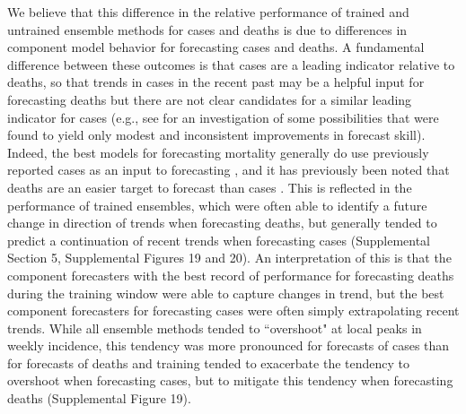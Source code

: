\documentclass[11pt,3p,review,authoryear]{elsarticle}
\begin{document}
We believe that this difference in the relative performance of trained and untrained ensemble methods for cases and deaths is due to differences in component model behavior for forecasting cases and deaths.
A fundamental difference between these outcomes is that cases are a leading indicator relative to deaths, so that trends in cases in the recent past may be a helpful input for forecasting deaths \textemdash but there are not clear candidates for a similar leading indicator for cases (e.g., see \cite{mcdonald_auxiliary_indicators_covid_2021} for an investigation of some possibilities that were found to yield only modest and inconsistent improvements in forecast skill).
Indeed, the best models for forecasting mortality generally do use previously reported cases as an input to forecasting \citep{cramerEvaluationIndividualEnsemble2021}, and it has previously been noted that deaths are an easier target to forecast than cases \citep{2021Reich_covid_predictability_blog, bracher_preregistered_covid_de_pl_2021}.
This is reflected in the performance of trained ensembles, which were often able to identify a future change in direction of trends when forecasting deaths, but generally tended to predict a continuation of recent trends when forecasting cases (Supplemental Section 5, Supplemental Figures 19 and 20).
An interpretation of this is that the component forecasters with the best record of performance for forecasting deaths during the training window were able to capture changes in trend, but the best component forecasters for forecasting cases were often simply extrapolating recent trends.
While all ensemble methods tended to ``overshoot" at local peaks in weekly incidence, this tendency was more pronounced for forecasts of cases than for forecasts of deaths \textemdash and training tended to exacerbate the tendency to overshoot when forecasting cases, but to mitigate this tendency when forecasting deaths (Supplemental Figure 19).

\end{document}
